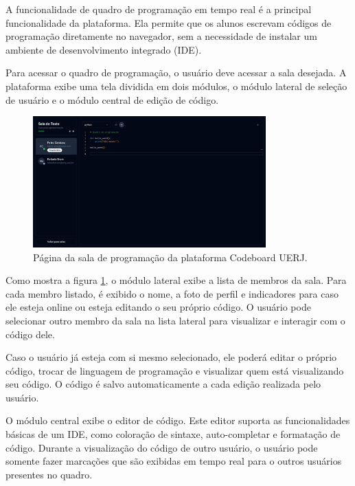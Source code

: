 A funcionalidade de quadro de programação em tempo real é a principal funcionalidade da plataforma. Ela permite que os alunos escrevam códigos de programação diretamente no navegador, sem a necessidade de instalar um ambiente de desenvolvimento integrado (IDE).

Para acessar o quadro de programação, o usuário deve acessar a sala desejada. A plataforma exibe uma tela dividida em dois módulos, o módulo lateral de seleção de usuário e o módulo central de edição de código.

\begin{figure}[H]
    \centering
    \includegraphics[width=0.8\textwidth]{assets/codeboard/room-details-page.png}
    \caption{Página da sala de programação da plataforma Codeboard UERJ.}
    \label{fig:room-details-page}
\end{figure}


Como mostra a figura \ref{fig:room-details-page}, o módulo lateral exibe a lista de membros da sala. Para cada membro listado, é exibido o nome, a foto de perfil e indicadores para caso ele esteja online ou esteja editando o seu próprio código. O usuário pode selecionar outro membro da sala na lista lateral para visualizar e interagir com o código dele.

Caso o usuário já esteja com si mesmo selecionado, ele poderá editar o próprio código, trocar de linguagem de programação e visualizar quem está visualizando seu código. O código é salvo automaticamente a cada edição realizada pelo usuário.


O módulo central exibe o editor de código. Este editor suporta as funcionalidades básicas de um IDE, como coloração de sintaxe, auto-completar e formatação de código. Durante a visualização do código de outro usuário, o usuário pode somente fazer marcações que são exibidas em tempo real para o outros usuários presentes no quadro.


